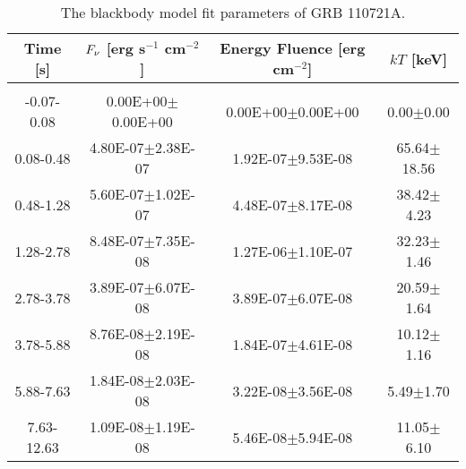 \begin{table}[h]
\centering
\scriptsize
\label{tab:}
\begin{tabular}{c| c c c}
Time [s] & $F_{\nu}$ [erg s$^{-1}$ cm$^{-2}$] & Energy Fluence [erg cm$^{-2}$] & $kT$ [keV] \\
\hline \hline\\ 

-0.07-0.08 & 0.00E+00$\pm$0.00E+00 & 0.00E+00$\pm$0.00E+00 & 0.00$\pm$0.00 \\ 

0.08-0.48 & 4.80E-07$\pm$2.38E-07 & 1.92E-07$\pm$9.53E-08 & 65.64$\pm$18.56 \\ 

0.48-1.28 & 5.60E-07$\pm$1.02E-07 & 4.48E-07$\pm$8.17E-08 & 38.42$\pm$4.23 \\ 

1.28-2.78 & 8.48E-07$\pm$7.35E-08 & 1.27E-06$\pm$1.10E-07 & 32.23$\pm$1.46 \\ 

2.78-3.78 & 3.89E-07$\pm$6.07E-08 & 3.89E-07$\pm$6.07E-08 & 20.59$\pm$1.64 \\ 

3.78-5.88 & 8.76E-08$\pm$2.19E-08 & 1.84E-07$\pm$4.61E-08 & 10.12$\pm$1.16 \\ 

5.88-7.63 & 1.84E-08$\pm$2.03E-08 & 3.22E-08$\pm$3.56E-08 & 5.49$\pm$1.70 \\ 

7.63-12.63 & 1.09E-08$\pm$1.19E-08 & 5.46E-08$\pm$5.94E-08 & 11.05$\pm$6.10 \\ 

\end{tabular}
\caption{The blackbody model fit parameters of GRB 110721A.}
\end{table}

